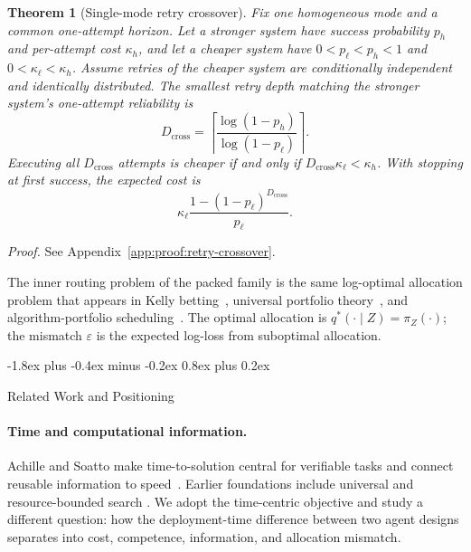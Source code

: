 \documentclass[10pt,twocolumn]{article}
\makeatletter
\theoremstyle{paperplain}
\newtheorem{theorem}{Theorem}[section]
\theoremstyle{paperdefinition}
\theoremstyle{paperremark}
\renewcommand{\section}{%
  \@startsection{section}{1}{\z@}%
    {-1.8ex plus -0.4ex minus -0.2ex}%
    {0.8ex plus 0.2ex}%
    {\normalfont\large\bfseries\raggedright}}
\makeatother
\begin{document}
\begin{theorem}[Single-mode retry crossover]
\label{thm:retry-crossover}
Fix one homogeneous mode and a common one-attempt horizon.  Let a stronger
system have success probability $p_h$ and per-attempt cost $\kappa_h$, and let
a cheaper system have $0<p_\ell<p_h<1$ and
$0<\kappa_\ell<\kappa_h$.  Assume retries of the cheaper system are
conditionally independent and identically distributed.  The smallest retry
depth matching the stronger system's one-attempt reliability is
\[
D_{\mathrm{cross}}
=
\left\lceil
\frac{\log(1-p_h)}{\log(1-p_\ell)}
\right\rceil.
\]
Executing all $D_{\mathrm{cross}}$ attempts is cheaper if and only if
$D_{\mathrm{cross}}\kappa_\ell<\kappa_h$.  With stopping at first success,
the expected cost is
\[
\kappa_\ell
\frac{1-(1-p_\ell)^{D_{\mathrm{cross}}}}{p_\ell}.
\]
\end{theorem}

\par\noindent\emph{Proof.} See Appendix~\ref{app:proof:retry-crossover}.\par

The inner routing problem of the packed family is the same log-optimal allocation problem that appears in Kelly betting~\cite{kelly1956}, universal portfolio theory~\cite{cover-thomas2006}, and algorithm-portfolio scheduling~\cite{gomes-selman2001}. The optimal allocation is $q^*(\cdot \mid Z)=\pi_Z(\cdot)$; the mismatch $\varepsilon$ is the expected log-loss from suboptimal allocation.

\section{Related Work and Positioning}
\label{sec:related}

\paragraph{Time and computational information.}
Achille and Soatto make time-to-solution central for verifiable tasks and
connect reusable information to speed~\cite{achille2026}.  Earlier
foundations include universal and resource-bounded search
\cite{solomonoff1964,levin1973,livitanyi2008,levin_1984_randomness_conservation,
schmidhuber_2002_speed_prior}.  We adopt the time-centric objective and study a
different question: how the deployment-time difference between two agent
designs separates into cost, competence, information, and allocation mismatch.
\end{document}
